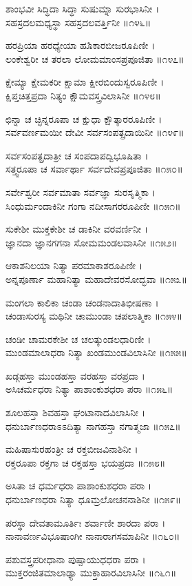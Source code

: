 ಶಾಂಭವೀ ಸಿದ್ಧಿದಾ ಸಿದ್ಧಾ ಸುಷುಮ್ನಾ ಸುರಭಾಸಿನೀ ।\\
ಸಹಸ್ರದಲಮಧ್ಯಸ್ಥಾ ಸಹಸ್ರದಲವರ್ತ್ತಿನೀ ॥೧೪೬॥

ಹರಪ್ರಿಯಾ ಹರಧ್ಯೇಯಾ ಹೂಁಕಾರಬೀಜರೂಪಿಣೀ ।\\
ಲಂಕೇಶ್ವರೀ ಚ ತರಲಾ ಲೋಮಮಾಂಸಪ್ರಪೂಜಿತಾ ॥೧೪೭॥

ಕ್ಷೇಮ್ಯಾ ಕ್ಷೇಮಕರೀ ಕ್ಷಾಮಾ ಕ್ಷೀರಬಿಂದುಸ್ವರೂಪಿಣೀ ।\\
ಕ್ಷಿಪ್ತಚಿತ್ತಪ್ರದಾ ನಿತ್ಯಂ ಕ್ಷೌಮವಸ್ತ್ರವಿಲಾಸಿನೀ ॥೧೪೮॥

ಛಿನ್ನಾ ಚ ಚ್ಛಿನ್ನರೂಪಾ ಚ ಕ್ಷುಧಾ ಕ್ಷೌತ್ಕಾರರೂಪಿಣೀ ।\\
ಸರ್ವವರ್ಣಮಯೀ ದೇವೀ ಸರ್ವಸಂಪತ್ಪ್ರದಾಯಿನೀ ॥೧೪೯॥

ಸರ್ವಸಂಪತ್ಪ್ರದಾತ್ರೀ ಚ ಸಂಪದಾಪದ್ವಿಭೂಷಿತಾ ।\\
ಸತ್ತ್ವರೂಪಾ ಚ ಸರ್ವಾರ್ಥಾ ಸರ್ವದೇವಪ್ರಪೂಜಿತಾ ॥೧೫೦॥

ಸರ್ವೇಶ್ವರೀ ಸರ್ವಮಾತಾ ಸರ್ವಜ್ಞಾ ಸುರಸೃತ್ಮಿಕಾ ।\\
ಸಿಂಧುರ್ಮಂದಾಕಿನೀ ಗಂಗಾ ನದೀಸಾಗರರೂಪಿಣೀ ॥೧೫೧॥

ಸುಕೇಶೀ ಮುಕ್ತಕೇಶೀ ಚ ಡಾಕಿನೀ ವರವರ್ಣಿನೀ ।\\
ಜ್ಞಾನದಾ ಜ್ಞಾನಗಗನಾ ಸೋಮಮಂಡಲವಾಸಿನೀ ॥೧೫೨॥

ಆಕಾಶನಿಲಯಾ ನಿತ್ಯಾ ಪರಮಾಕಾಶರೂಪಿಣೀ ।\\
ಅನ್ನಪೂರ್ಣಾ ಮಹಾನಿತ್ಯಾ ಮಹಾದೇವರಸೋದ್ಭವಾ ॥೧೫೩॥

ಮಂಗಲಾ ಕಾಲಿಕಾ ಚಂಡಾ ಚಂಡನಾದಾತಿಭೀಷಣಾ ।\\
ಚಂಡಾಸುರಸ್ಯ ಮಥಿನೀ ಚಾಮುಂಡಾ ಚಪಲಾತ್ಮಿಕಾ ॥೧೫೪॥

ಚಂಡೀ ಚಾಮರಕೇಶೀ ಚ ಚಲತ್ಕುಂಡಲಧಾರಿಣೀ ।\\
ಮುಂಡಮಾಲಾಧರಾ ನಿತ್ಯಾ ಖಂಡಮುಂಡವಿಲಾಸಿನೀ ॥೧೫೫॥

ಖಡ್ಗಹಸ್ತಾ ಮುಂಡಹಸ್ತಾ ವರಹಸ್ತಾ ವರಪ್ರದಾ ।\\
ಅಸಿಚರ್ಮಧರಾ ನಿತ್ಯಾ ಪಾಶಾಂಕುಶಧರಾ ಪರಾ ॥೧೫೬॥

ಶೂಲಹಸ್ತಾ ಶಿವಹಸ್ತಾ ಘಂಟಾನಾದವಿಲಾಸಿನೀ ।\\
ಧನುರ್ಬಾಣಧರಾಽಽದಿತ್ಯಾ ನಾಗಹಸ್ತಾ ನಗಾತ್ಮಜಾ ॥೧೫೭॥

ಮಹಿಷಾಸುರಹಂತ್ರೀ ಚ ರಕ್ತಬೀಜವಿನಾಶಿನೀ ।\\
ರಕ್ತರೂಪಾ ರಕ್ತಗಾ ಚ ರಕ್ತಹಸ್ತಾ ಭಯಪ್ರದಾ ॥೧೫೮॥

ಅಸಿತಾ ಚ ಧರ್ಮಧರಾ ಪಾಶಾಂಕುಶಧರಾ ಪರಾ ।\\
ಧನುರ್ಬಾಣಧರಾ ನಿತ್ಯಾ ಧೂಮ್ರಲೋಚನನಾಶಿನೀ ॥೧೫೯॥

ಪರಸ್ಥಾ ದೇವತಾಮೂರ್ತಿಃ ಶರ್ವಾಣೀ ಶಾರದಾ ಪರಾ ।\\
ನಾನಾವರ್ಣವಿಭೂಷಾಂಗೀ ನಾನಾರಾಗಸಮಾಪಿನೀ ॥೧೬೦॥

ಪಶುವಸ್ತ್ರಪರೀಧಾನಾ ಪುಷ್ಪಾಯುಧಧರಾ ಪರಾ ।\\
ಮುಕ್ತರಂಜಿತಮಾಲಾಢ್ಯಾ ಮುಕ್ತಾಹಾರವಿಲಾಸಿನೀ ॥೧೬೧॥

